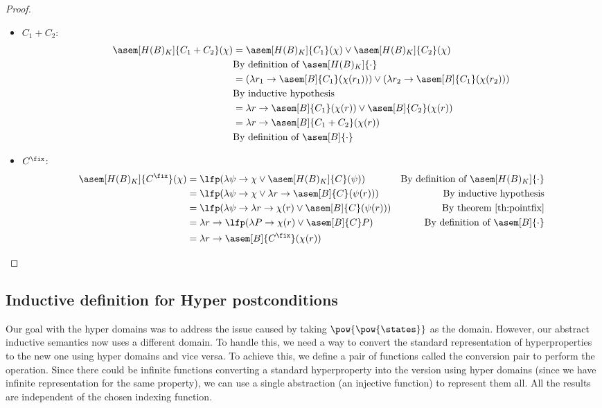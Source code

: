 \begin{proof}
\begin{itemize}
    \item $C_1 + C_2$:
      \begin{align*}
        \asem[H(B)_K]{C_1 + C_2}(\chi)
          &= \asem[H(B)_K]{C_1}(\chi) 
            \lor \asem[H(B)_K]{C_2}(\chi) \\
          &\text{By definition of $\asem[H(B)_K]{\cdot}$} \\
          &= (\lambda r_1 \to \asem[B]{C_1}(\chi(r_1)))
            \lor (\lambda r_2 \to \asem[B]{C_1}(\chi(r_2))) \\
          &\text{By inductive hypothesis} \\
          &= \lambda r \to \asem[B]{C_1}(\chi(r))
            \lor \asem[B]{C_2}(\chi(r)) \\
          &= \lambda r \to \asem[B]{C_1 + C_2}(\chi(r)) \\
          &\text{By definition of $\asem[B]{\cdot}$} \\
      \end{align*}

    \item $C^\fix$:
      \begin{align*}
        \asem[H(B)_K]{C^\fix}(\chi)
          &= \lfp(\lambda \psi \to 
            \chi \lor \asem[H(B)_K]{C}(\psi))
          &\text{By definition of $\asem[H(B)_K]{\cdot}$} \\
          &= \lfp(\lambda \psi \to 
            \chi \lor \lambda r \to \asem[B]{C}(\psi(r)))
          &\text{By inductive hypothesis} \\
          &= \lfp(\lambda \psi \to \lambda r \to
            \chi(r) \lor \asem[B]{C}(\psi(r)))
          &\text{By theorem \ref{th:pointfix}} \\
          &= \lambda r \to \lfp(\lambda P 
            \to \chi(r) \lor \asem[B]{C} P)
          &\text{By definition of $\asem[B]{\cdot}$} \\
          &= \lambda r \to \asem[B]{C^\fix}(\chi(r))
      \end{align*}
  \end{itemize}
\end{proof}


\subsection{Inductive definition for Hyper postconditions}

Our goal with the hyper domains was to address the issue caused by taking 
$\pow{\pow{\states}}$ as the domain. However, our abstract inductive semantics 
now uses a different domain. To handle this, we need a way to convert the 
standard representation of hyperproperties to the new one using hyper domains 
and vice versa. To achieve this, we define a pair of functions called the 
conversion pair to perform the operation. Since there could be infinite 
functions converting a standard hyperproperty into the version using hyper 
domains (since we have infinite representation for the same property), we can 
use a single abstraction (an injective function) to represent them all. 
All the results are independent of the chosen indexing function.

